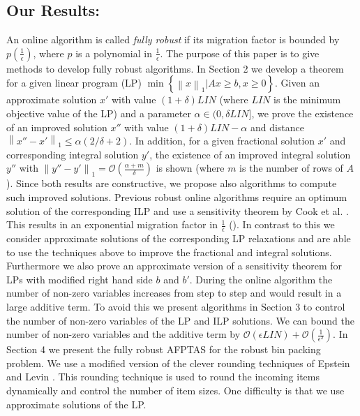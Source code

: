 \documentclass[a4paper,11pt]{article}
\newcommand{\mengest}[2]{\left\{#1|#2\right\}}
\newcommand{\nor}[1]{\left\|#1\right\|}
\begin{document}
\subsection{Our Results:}
An online algorithm is called \emph{fully robust} if its migration factor is bounded by
$p(\frac{1}{\epsilon})$, where $p$ is a polynomial in $\frac{1}{\epsilon}$.
The purpose of this paper is to give methods to develop fully robust
algorithms. In Section 2 we develop a theorem for a given linear program (LP)
$\min \mengest{\nor{x}_1}{Ax \geq b, x \geq 0 }$.
Given an approximate solution $x'$ 
with value $(1+ \delta)\mathit{LIN}$ (where $\mathit{LIN}$ is the minimum objective value of the LP)
and a parameter $\alpha \in (0,\delta \mathit{LIN} ]$, we prove the existence of an improved solution $x''$
with value $(1+ \delta)\mathit{LIN} - \alpha$ and distance $\nor{x'' - x'}_1 \leq \alpha(2/ \delta + 2)$.
In addition, for a given fractional solution $x'$ and corresponding integral solution $y'$, the existence
of an improved integral solution $y''$ with $\nor{y''-y'}_1 = \mathcal{O}(\frac{\alpha+m}{\delta})$ is shown
(where $m$ is the number of rows of $A$). Since both results are constructive, we propose also algorithms
to compute such improved solutions.
Previous robust online algorithms require an optimum solution of the corresponding ILP and use a sensitivity theorem
by Cook et al. \cite{cook1986sensitivity}.
This results in an exponential migration factor in $\frac{1}{\epsilon}$
(\cite{epstein2006robust, epsteinu, skutella2010, sanders2009}).
In contrast to this we consider approximate solutions of the corresponding LP relaxations and are able
to use the techniques above to improve the fractional and integral solutions.
Furthermore we also prove an approximate version of a sensitivity theorem for LPs with modified right
hand side $b$ and $b'$.
During the online algorithm the number of non-zero variables increases from step to step and would result
in a large additive term. To avoid this we present algorithms in Section 3 to control the number
of non-zero variables of the LP and ILP solutions. We can bound the number of non-zero variables and the
additive term by $\mathcal{O}(\epsilon \mathit{LIN}) + \mathcal{O}(\frac{1}{\epsilon^2})$.
In Section 4 we present the fully robust AFPTAS for the robust bin packing problem. We use a modified
version of the clever rounding techniques of Epstein and Levin \cite{epstein2006robust}.
This rounding technique is used to round the incoming items dynamically and control the number of item sizes.
One difficulty is that we use approximate solutions of the LP.
\end{document}
